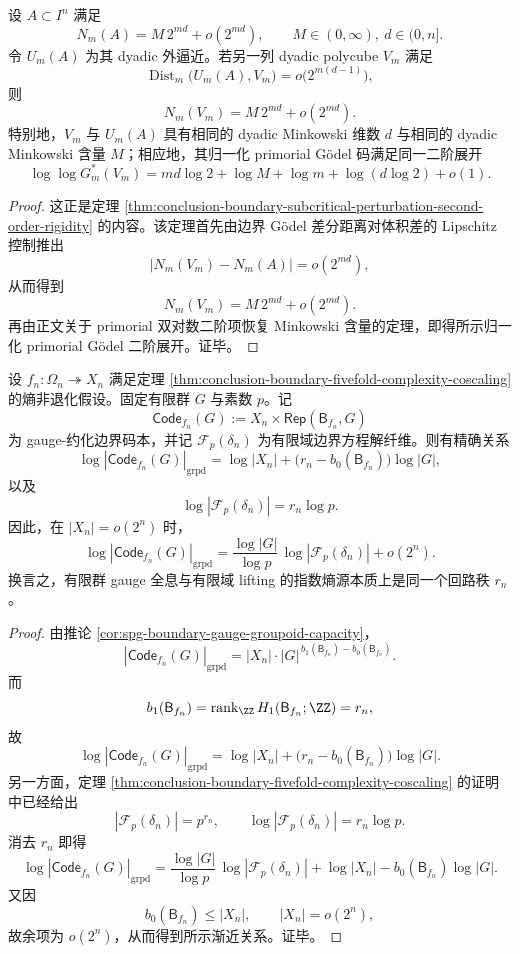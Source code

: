 \begin{theorem}\label{thm:conclusion-boundary-subcritical-noise-minkowski-content-rigidity}
设 \(A\subset I^n\) 满足
\[
N_m(A)=M\,2^{md}+o(2^{md}),
\qquad
M\in(0,\infty),\ d\in(0,n].
\]
令 \(U_m(A)\) 为其 dyadic 外逼近。若另一列 dyadic polycube \(V_m\) 满足
\[
\operatorname{Dist}_m\bigl(U_m(A),V_m\bigr)=o\!\bigl(2^{m(d-1)}\bigr),
\]
则
\[
N_m(V_m)=M\,2^{md}+o(2^{md}).
\]
特别地，\(V_m\) 与 \(U_m(A)\) 具有相同的 dyadic Minkowski 维数 \(d\) 与相同的 dyadic Minkowski 含量 \(M\)；相应地，其归一化 primorial Gödel 码满足同一二阶展开
\[
\log\log G_m^*(V_m)
=
md\log 2+\log M+\log m+\log(d\log 2)+o(1).
\]
\end{theorem}
\begin{proof}
这正是定理 \ref{thm:conclusion-boundary-subcritical-perturbation-second-order-rigidity} 的内容。该定理首先由边界 Gödel 差分距离对体积差的 Lipschitz 控制推出
\[
|N_m(V_m)-N_m(A)|=o(2^{md}),
\]
从而得到
\[
N_m(V_m)=M\,2^{md}+o(2^{md}).
\]
再由正文关于 primorial 双对数二阶项恢复 Minkowski 含量的定理，即得所示归一化 primorial Gödel 二阶展开。证毕。
\end{proof}

\begin{theorem}\label{thm:conclusion-boundary-gauge-lifting-shared-cycle-rank-entropy}
设 \(f_n:\Omega_n\twoheadrightarrow X_n\) 满足定理 \ref{thm:conclusion-boundary-fivefold-complexity-coscaling} 的熵非退化假设。固定有限群 \(G\) 与素数 \(p\)。记
\[
\mathsf{Code}_{f_n}(G):=X_n\times \mathsf{Rep}(\mathsf B_{f_n},G)
\]
为 gauge-约化边界码本，并记 \(\mathcal F_p(\delta_n)\) 为有限域边界方程解纤维。则有精确关系
\[
\log |\mathsf{Code}_{f_n}(G)|_{\mathrm{grpd}}
=
\log |X_n|+\bigl(r_n-b_0(\mathsf B_{f_n})\bigr)\log |G|,
\]
以及
\[
\log |\mathcal F_p(\delta_n)| = r_n\log p.
\]
因此，在 \(|X_n|=o(2^n)\) 时，
\[
\log |\mathsf{Code}_{f_n}(G)|_{\mathrm{grpd}}
=
\frac{\log |G|}{\log p}\,\log |\mathcal F_p(\delta_n)|+o(2^n).
\]
换言之，有限群 gauge 全息与有限域 lifting 的指数熵源本质上是同一个回路秩 \(r_n\)。
\end{theorem}
\begin{proof}
由推论 \ref{cor:spg-boundary-gauge-groupoid-capacity}，
\[
|\mathsf{Code}_{f_n}(G)|_{\mathrm{grpd}}
=
|X_n|\cdot |G|^{\,b_1(\mathsf B_{f_n})-b_0(\mathsf B_{f_n})}.
\]
而
\[
b_1(\mathsf B_{f_n})=\operatorname{rank}_{\ZZ}H_1(\mathsf B_{f_n};\ZZ)=r_n,
\]
故
\[
\log |\mathsf{Code}_{f_n}(G)|_{\mathrm{grpd}}
=
\log |X_n|+\bigl(r_n-b_0(\mathsf B_{f_n})\bigr)\log |G|.
\]
另一方面，定理 \ref{thm:conclusion-boundary-fivefold-complexity-coscaling} 的证明中已经给出
\[
|\mathcal F_p(\delta_n)|=p^{r_n},
\qquad
\log |\mathcal F_p(\delta_n)|=r_n\log p.
\]
消去 \(r_n\) 即得
\[
\log |\mathsf{Code}_{f_n}(G)|_{\mathrm{grpd}}
=
\frac{\log |G|}{\log p}\,\log |\mathcal F_p(\delta_n)|
+\log |X_n|-b_0(\mathsf B_{f_n})\log |G|.
\]
又因
\[
b_0(\mathsf B_{f_n})\le |X_n|,
\qquad
|X_n|=o(2^n),
\]
故余项为 \(o(2^n)\)，从而得到所示渐近关系。证毕。
\end{proof}

